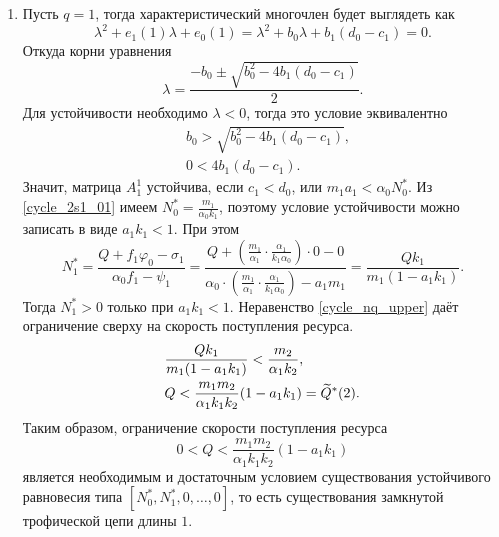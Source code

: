 \begin{enumerate}
\item Пусть \(q = 1\), тогда характеристический многочлен будет выглядеть как
\begin{equation*}
    \lambda^2 + e_1 (1) \lambda + e_0(1) = \lambda^2 + b_0 \lambda + b_1(d_0 - c_1) = 0.
\end{equation*}
Откуда корни уравнения
\begin{equation*}
    \lambda = \frac{-b_0 \pm \sqrt{b_0^2 - 4b_1 (d_0 - c_1)}}{2}.
\end{equation*}
Для устойчивости необходимо \(\lambda < 0\), тогда это условие эквивалентно
\begin{equation*}
    \begin{split}
        & b_0 > \sqrt{b_0^2 - 4b_1 (d_0 - c_1)}, \\
        & 0 < 4b_1 (d_0 - c_1).
    \end{split}
\end{equation*}
Значит, матрица \(A^1_1\) устойчива, если \(c_1 < d_0\), или \(m_1 a_1 < \alpha_0 N^*_0\). Из \eqref{cycle_2s1_01} имеем \(N^*_0 = \frac{m_1}{\alpha_0 k_1}\), поэтому условие устойчивости можно записать в виде \(a_1 k_1 < 1\). При этом
\begin{equation*}
    N^*_1 = \frac{Q + f_{1} \varphi_0 - \sigma_{1}}{ \alpha_0 f_{1} - \psi_{1} } = \frac{Q + \left( \frac{m_1}{\alpha_1} \cdot \frac{\alpha_1}{k_1 \alpha_0} \right) \cdot 0 - 0}{\alpha_0 \cdot \left( \frac{m_1}{\alpha_1} \cdot \frac{\alpha_1}{k_1 \alpha_0} \right) - a_1 m_1} = \frac{Q k_1}{m_1(1 - a_1 k_1)}.
\end{equation*}
Тогда \(N^*_1 > 0\) только при \(a_1 k_1 < 1\). Неравенство \eqref{cycle_nq_upper} даёт ограничение сверху на скорость поступления ресурса.
\begin{equation*}
    \begin{split}
        & \frac{Q k_1}{m_1(1 - a_1 k_1)} < \frac{m_2}{\alpha_1 k_2}, \\
        & Q < \frac{m_1 m_2}{\alpha_1 k_1 k_2} (1 - a_1 k_1) = \widetilde{Q}^*(2).        
    \end{split}
\end{equation*}
Таким образом, ограничение скорости поступления ресурса
\begin{equation*}
    0 < Q < \frac{m_1 m_2}{\alpha_1 k_1 k_2} (1 - a_1 k_1)
\end{equation*}
является необходимым и достаточным условием существования устойчивого равновесия типа \([N^*_0, N^*_1, 0, \dots, 0]\), то есть существования замкнутой трофической цепи длины \(1\).


\end{enumerate}
